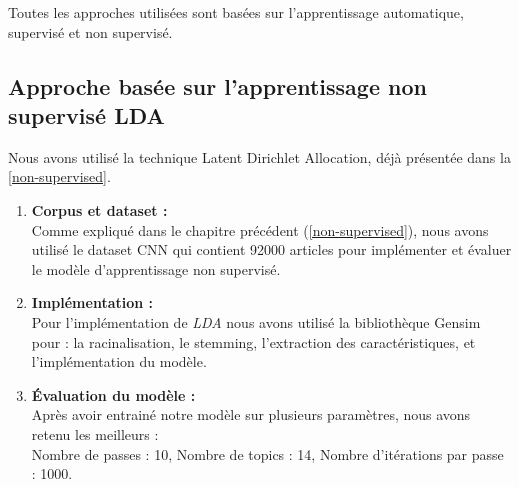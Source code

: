 Toutes les approches utilisées sont basées sur l'apprentissage automatique, supervisé et non supervisé. 
    \subsection{Approche basée sur l'apprentissage non supervisé LDA}
    Nous avons utilisé la technique \textquotedbl Latent Dirichlet Allocation\textquotedbl, déjà présentée dans la \autoref{non-supervised}.

    \begin{enumerate}
        \item \textbf{Corpus et dataset :}\\
        Comme expliqué dans le chapitre précédent (\autoref{non-supervised}), nous avons utilisé le dataset CNN qui contient 92000 articles pour implémenter et évaluer le modèle d'apprentissage non supervisé.

        \item \textbf{Implémentation :}\\
        Pour l'implémentation de \emph{LDA} nous avons utilisé la bibliothèque Gensim pour : la racinalisation, le stemming, l'extraction des caractéristiques, et l'implémentation du modèle. 

        \item \textbf{Évaluation du modèle :}\\
        Après avoir entrainé notre modèle sur plusieurs paramètres, nous avons retenu les meilleurs :\\
        Nombre de passes : 10, Nombre de topics : 14, Nombre d'itérations par passe : 1000. 
    \end{enumerate}

